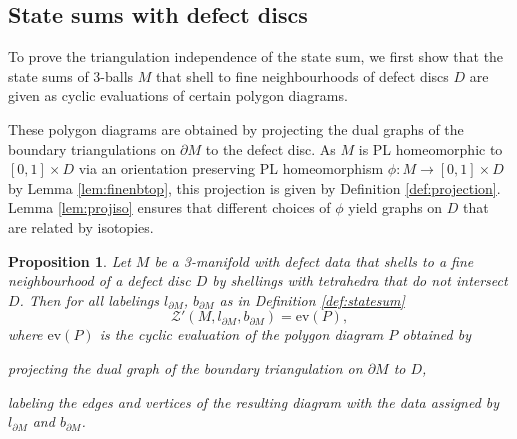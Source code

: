 \documentclass[1.5pt, a4paper]{article}
\newcommand{\ev}{\mathrm{ev}}
\newtheorem{proposition}[theorem]{Proposition}
\begin{document}
\subsection{State sums with defect discs}

To prove the triangulation independence of the state sum, we first show that the state sums of 3-balls $M$ that shell to fine neighbourhoods of defect 
discs $D$ are given as cyclic evaluations of certain polygon diagrams. 

These polygon diagrams are obtained by projecting the dual graphs of the boundary triangulations on $\partial M$ to the defect disc. As  $M$ is PL homeomorphic to $[0,1]\times D$ via an orientation preserving PL homeomorphism  $\phi: M\to [0,1]\times D$ by Lemma \ref{lem:finenbtop}, this projection is given by Definition \ref{def:projection}. Lemma \ref{lem:projiso} ensures that different choices of $\phi$ yield graphs on $D$ that are related by isotopies.


\begin{proposition}\label{th:topological invariance}
Let $M$ be a 3-manifold with defect data that shells to a fine neighbourhood 
 of  a defect disc $D$ by  shellings with tetrahedra that do not intersect $D$. 
Then for all labelings  $l_{\partial M}$, $b_{\partial M}$  as in Definition \ref{def:statesum}  
$$
\mathcal Z'(M, l_{\partial M}, b_{\partial M})=\ev(P),
$$
where 
$\ev(P)$ is
the cyclic evaluation of the polygon diagram $P$ obtained by
\begin{compactitem}
\item projecting the dual graph of the boundary triangulation on $\partial M$ to $D$,
\item labeling the edges and vertices of the resulting diagram with the data  assigned by $l_{\partial M}$ and $b_{\partial M}$.
\end{compactitem}
\end{proposition}
\end{document}
